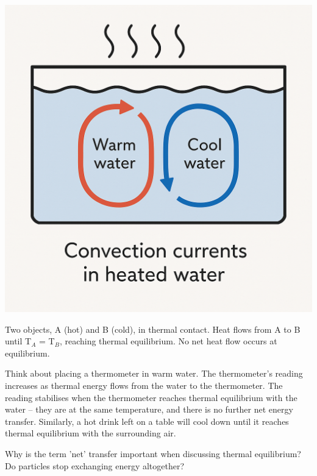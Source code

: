 \begin{marginfigure}[0pt]
\includegraphics[width=\linewidth]{convection_currents.png} %
\caption{Two objects, A (hot) and B (cold), in thermal contact. Heat flows from A to B until T\(_A\) = T\(_B\), reaching thermal equilibrium. No net heat flow occurs at equilibrium.}
\label{fig:thermal_equilibrium}
\end{marginfigure}

Think about placing a thermometer in warm water. The thermometer's reading increases as thermal energy flows from the water to the thermometer. The reading stabilises when the thermometer reaches thermal equilibrium with the water – they are at the same temperature, and there is no further net energy transfer. Similarly, a hot drink left on a table will cool down until it reaches thermal equilibrium with the surrounding air.

\begin{stopandthink}
Why is the term 'net' transfer important when discussing thermal equilibrium? Do particles stop exchanging energy altogether?
\end{stopandthink}


